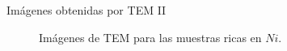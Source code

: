 \documentclass[11pt]{beamer}
\begin{document}
			\begin{frame}{Imágenes obtenidas por TEM II}
				 \begin{figure}[H]
				 	\captionsetup[subfloat]{labelformat=empty}
					\centering
						\qquad
					\caption*{Imágenes de TEM para las muestras ricas en $Ni$.}
					\label{TEMNiRich}
				\end{figure}
			\end{frame}
			
\end{document}
